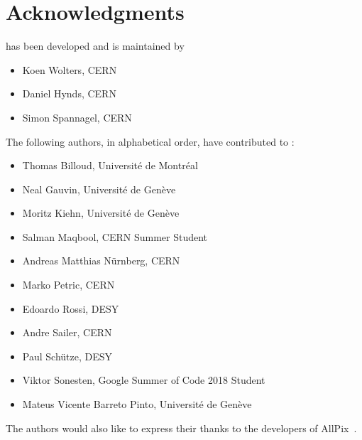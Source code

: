 \chapter{Acknowledgments}

\apsq has been developed and is maintained by

\begin{itemize}
\item Koen Wolters, CERN
\item Daniel Hynds, CERN
\item Simon Spannagel, CERN
\end{itemize}

The following authors, in alphabetical order, have contributed to \apsq:

\begin{itemize}
\item  Thomas Billoud, Université de Montréal
\item Neal Gauvin, Université de Genève
\item  Moritz Kiehn, Université de Genève
\item  Salman Maqbool, CERN Summer Student
\item  Andreas Matthias Nürnberg, CERN
\item  Marko Petric, CERN
\item  Edoardo Rossi, DESY
\item  Andre Sailer, CERN
\item  Paul Schütze, DESY
\item  Viktor Sonesten, Google Summer of Code 2018 Student
\item  Mateus Vicente Barreto Pinto, Université de Genève
\end{itemize}

The authors would also like to express their thanks to the developers of AllPix~\cite{ap1wiki,ap1git}.
